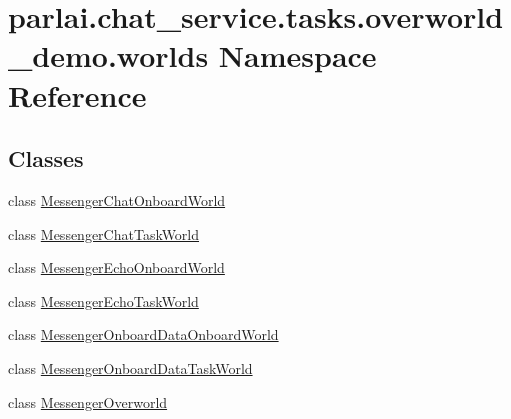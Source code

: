 \hypertarget{namespaceparlai_1_1chat__service_1_1tasks_1_1overworld__demo_1_1worlds}{}\section{parlai.\+chat\+\_\+service.\+tasks.\+overworld\+\_\+demo.\+worlds Namespace Reference}
\label{namespaceparlai_1_1chat__service_1_1tasks_1_1overworld__demo_1_1worlds}
\subsection*{Classes}
\begin{DoxyCompactItemize}
\item 
class \hyperlink{classparlai_1_1chat__service_1_1tasks_1_1overworld__demo_1_1worlds_1_1MessengerChatOnboardWorld}{Messenger\+Chat\+Onboard\+World}
\item 
class \hyperlink{classparlai_1_1chat__service_1_1tasks_1_1overworld__demo_1_1worlds_1_1MessengerChatTaskWorld}{Messenger\+Chat\+Task\+World}
\item 
class \hyperlink{classparlai_1_1chat__service_1_1tasks_1_1overworld__demo_1_1worlds_1_1MessengerEchoOnboardWorld}{Messenger\+Echo\+Onboard\+World}
\item 
class \hyperlink{classparlai_1_1chat__service_1_1tasks_1_1overworld__demo_1_1worlds_1_1MessengerEchoTaskWorld}{Messenger\+Echo\+Task\+World}
\item 
class \hyperlink{classparlai_1_1chat__service_1_1tasks_1_1overworld__demo_1_1worlds_1_1MessengerOnboardDataOnboardWorld}{Messenger\+Onboard\+Data\+Onboard\+World}
\item 
class \hyperlink{classparlai_1_1chat__service_1_1tasks_1_1overworld__demo_1_1worlds_1_1MessengerOnboardDataTaskWorld}{Messenger\+Onboard\+Data\+Task\+World}
\item 
class \hyperlink{classparlai_1_1chat__service_1_1tasks_1_1overworld__demo_1_1worlds_1_1MessengerOverworld}{Messenger\+Overworld}
\end{DoxyCompactItemize}
